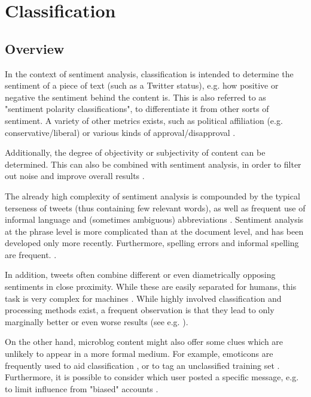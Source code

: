 \documentclass{sig-alternate}
\begin{document}
\section{Classification}

\subsection{Overview}

In the context of sentiment analysis, classification is intended to determine the sentiment of a piece of text (such as a Twitter status), e.g. how positive or negative the sentiment behind the content is. This is also referred to as "sentiment polarity classifications", to differentiate it from other sorts of sentiment. A variety of other metrics exists, such as political affiliation (e.g. conservative/liberal) or various kinds of approval/disapproval \cite{pang2008opinion}.

Additionally, the degree of objectivity or subjectivity of content can be determined. This can also be combined with sentiment analysis, in order to filter out noise and improve overall results \cite{barbosa2010robust}.


The already high complexity of sentiment analysis is compounded by the typical terseness of tweets (thus containing few relevant words), as well as frequent use of informal language and (sometimes ambiguous) abbreviations \cite{kouloumpis2011twitter}. Sentiment analysis at the phrase level is more complicated than at the document level, and has been developed only more recently. Furthermore, spelling errors and informal spelling are frequent. \cite{agarwal2011sentiment}.

In addition, tweets often combine different or even diametrically opposing sentiments in close proximity. While these are easily separated for humans, this task is very complex for machines \cite{vinodhini2012sentiment}. While highly involved classification and processing methods exist, a frequent observation is that they lead to only marginally better or even worse results (see e.g. \cite{agarwal2011sentiment}).

On the other hand, microblog content might also offer some clues which are unlikely to appear in a more formal medium. For example, emoticons are frequently used to aid classification \cite{agarwal2011sentiment, kouloumpis2011twitter}, or to tag an unclassified training set \cite{go2009twitter}. Furthermore, it is possible to consider which user posted a specific message, e.g. to limit influence from "biased" accounts \cite{barbosa2010robust}.
\end{document}
